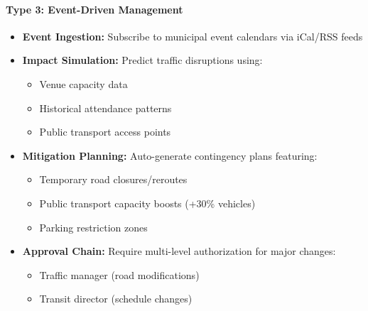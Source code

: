 \documentclass[11.5pt]{article}
\begin{document}
    \paragraph{Type 3: Event-Driven Management}
    \begin{itemize}
        \item \textbf{Event Ingestion:} Subscribe to municipal event calendars via iCal/RSS feeds
        \item \textbf{Impact Simulation:} Predict traffic disruptions using:
        \begin{itemize}
            \item Venue capacity data
            \item Historical attendance patterns
            \item Public transport access points
        \end{itemize}
        \item \textbf{Mitigation Planning:} Auto-generate contingency plans featuring:
        \begin{itemize}
            \item Temporary road closures/reroutes
            \item Public transport capacity boosts (+30\% vehicles)
            \item Parking restriction zones
        \end{itemize}
        \item \textbf{Approval Chain:} Require multi-level authorization for major changes:
        \begin{itemize}
            \item Traffic manager (road modifications)
            \item Transit director (schedule changes)
        \end{itemize}
    \end{itemize}
    
\end{document}
